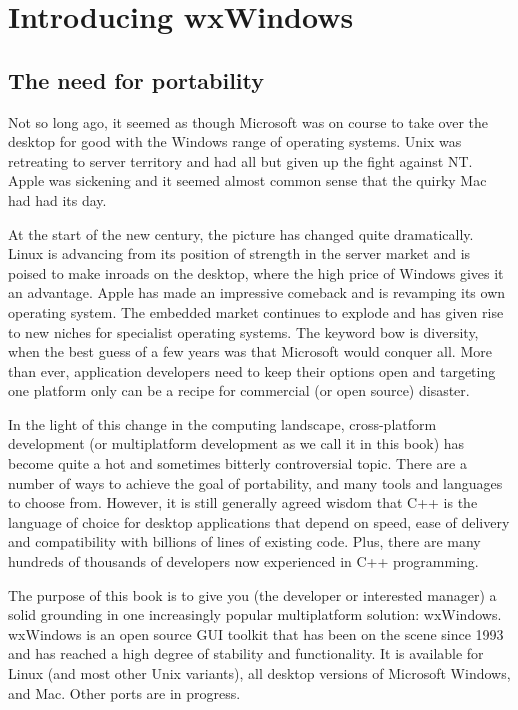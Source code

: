 \chapter{Introducing wxWindows}\label{chapintro}
%
%
\setfooter{\thepage}{}{}{}{}{\thepage}%

\section{The need for portability}

Not so long ago, it seemed as though Microsoft was on course to
take over the desktop for good with the Windows range of
operating systems. Unix was retreating to server territory and
had all but given up the fight against NT. Apple was sickening
and it seemed almost common sense that the quirky Mac had had
its day.

At the start of the new century, the picture has changed quite
dramatically. Linux is advancing from its position of strength
in the server market and is poised to make inroads on the
desktop, where the high price of Windows gives it an advantage.
Apple has made an impressive comeback and is revamping its own
operating system. The embedded market continues to explode and
has given rise to new niches for specialist operating systems.
The keyword bow is diversity, when the best guess of a few years
was that Microsoft would conquer all. More than ever,
application developers need to keep their options open and
targeting one platform only can be a recipe for commercial (or
open source) disaster.

In the light of this change in the computing landscape,
cross-platform development (or multiplatform development as we
call it in this book) has become quite a hot and sometimes
bitterly controversial topic. There are a number of ways to
achieve the goal of portability, and many tools and languages to choose from.
However, it is still generally agreed wisdom that C++ is the
language of choice for desktop applications that depend on
speed, ease of delivery and compatibility with billions of lines
of existing code. Plus, there are many hundreds of thousands of
developers now experienced in C++ programming.

The purpose of this book is to give you (the developer or
interested manager) a solid grounding in one increasingly
popular multiplatform solution: wxWindows. wxWindows is an open
source GUI toolkit that has been on the scene since 1993 and has
reached a high degree of stability and functionality. It is
available for Linux (and most other Unix variants), all desktop
versions of Microsoft Windows, and Mac. Other ports are in
progress.

